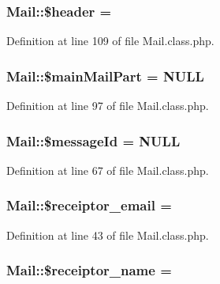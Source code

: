 \subsubsection[{\$header}]{\setlength{\rightskip}{0pt plus 5cm}Mail\+::\$header = \textquotesingle{}\textquotesingle{}}\label{classMail_ace98431d0944d23544743094b443d506}


Definition at line 109 of file Mail.\+class.\+php.

\hypertarget{classMail_ad58544ae1c34119ec852e3c22b855624}{}
\subsubsection[{\$main\+Mail\+Part}]{\setlength{\rightskip}{0pt plus 5cm}Mail\+::\$main\+Mail\+Part = N\+U\+L\+L}\label{classMail_ad58544ae1c34119ec852e3c22b855624}


Definition at line 97 of file Mail.\+class.\+php.

\hypertarget{classMail_a48caf58883e736f50ab87a03147c584a}{}
\subsubsection[{\$message\+Id}]{\setlength{\rightskip}{0pt plus 5cm}Mail\+::\$message\+Id = N\+U\+L\+L}\label{classMail_a48caf58883e736f50ab87a03147c584a}


Definition at line 67 of file Mail.\+class.\+php.

\hypertarget{classMail_aa034785886f8bdcf3a5ed9c86ce8ed14}{}
\subsubsection[{\$receiptor\+\_\+email}]{\setlength{\rightskip}{0pt plus 5cm}Mail\+::\$receiptor\+\_\+email = \textquotesingle{}\textquotesingle{}}\label{classMail_aa034785886f8bdcf3a5ed9c86ce8ed14}


Definition at line 43 of file Mail.\+class.\+php.

\hypertarget{classMail_a44df4937f3c8b2691e9bbb1220c667f3}{}
\subsubsection[{\$receiptor\+\_\+name}]{\setlength{\rightskip}{0pt plus 5cm}Mail\+::\$receiptor\+\_\+name = \textquotesingle{}\textquotesingle{}}\label{classMail_a44df4937f3c8b2691e9bbb1220c667f3}


